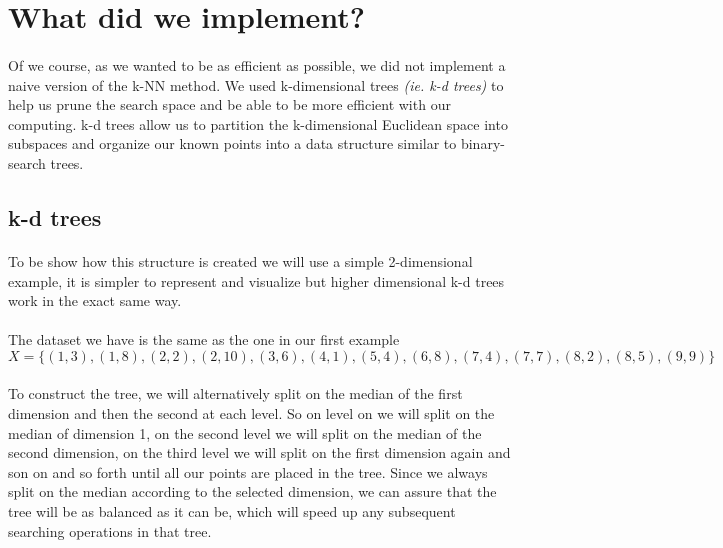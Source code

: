 \documentclass[11 pt]{article}
\begin{document}
\paragraph{}



\section{What did we implement?}
\paragraph{}Of we course, as we wanted to be as efficient as possible, we did not implement a naive version of the k-NN method. We used k-dimensional trees \emph{(ie. k-d trees)} to help us prune the search space and be able to be more efficient with our computing. k-d trees allow us to partition the k-dimensional Euclidean space into subspaces and organize our known points into a data structure similar to binary-search trees.
\subsection{k-d trees}
\paragraph{}To be show how this structure is created we will use a simple 2-dimensional example, it is simpler to represent and visualize but higher dimensional k-d trees work in the exact same way.
\paragraph{}The dataset we have is the same as the one in our first example
\begin{equation*}
  X=\{(1, 3),(1, 8), (2, 2), (2, 10), (3, 6), (4, 1), (5, 4), (6, 8), (7, 4), (7, 7), (8, 2), (8, 5), (9, 9)\}
\end{equation*}
\paragraph{}To construct the tree, we will alternatively split on the median of the first dimension and then the second at each level. So on level on we will split on the median of dimension 1, on the second level we will split on the median of the second dimension, on the third level we will split on the first dimension again and son on and so forth until all our points are placed in the tree. Since we always split on the median according to the selected dimension, we can assure that the tree will be as balanced as it can be, which will speed up any subsequent searching operations in that tree.
\end{document}
